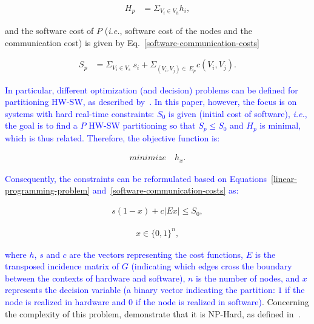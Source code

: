 \documentclass{doublecol-new}
\theoremstyle{TH}{
\newtheorem{lemma}{Lemma}
\newtheorem{theorem}[lemma]{Theorem}
\newtheorem{corrolary}[lemma]{Corrolary}
\newtheorem{conjecture}[lemma]{Conjecture}
\newtheorem{proposition}[lemma]{Proposition}
\newtheorem{claim}[lemma]{Claim}
\newtheorem{stheorem}[lemma]{Wrong Theorem}
\newtheorem{algorithm}{Algorithm}
}
\theoremstyle{THrm}{
\newtheorem{definition}{Definition}[section]
\newtheorem{question}{Question}[section]
\newtheorem{remark}{Remark}
\newtheorem{scheme}{Scheme}
}
\theoremstyle{THhit}{
\newtheorem{case}{Case}[section]
}
\begin{document}
\vspace{-5 mm}
\begin{align}
\label{hardware-costs}
H_p  &= \Sigma_{V_i \in V_h} h_i,
\end{align}

\vspace{2 mm}
\noindent
and the software cost of $P$ ({\it i.e.}, software cost of the nodes and the communication cost) is given by Eq.~\eqref{software-communication-costs}

\vspace{-3 mm}
\begin{align}
\label{software-communication-costs}
  S_p &= \Sigma_{V_i \in V_s}\:s_i + \Sigma_{(V_i,V_j)\in\:E_p} c(V_i,V_j).
\end{align}

\vspace{2 mm}
\textcolor{blue}{In particular, different optimization (and decision) problems can be defined for partitioning HW-SW, as described by~\cite{Arato2003}. In this paper, however, the focus is on systems with hard real-time constraints: $ S_0 $ is given (initial cost of software), {\it i.e.}, the goal is to find a $P$ HW-SW partitioning so that $ S_p \leq S_0 $ and $ H_p $ is minimal, which is thus related. Therefore, the objective function is:} 

\vspace{-2 mm}
\begin{align}
\label{objective-function}
minimize\quad h_x.
\end{align}

\textcolor{blue}{Consequently, the constraints can be reformulated based on Equations~\eqref{linear-programming-problem} and~\eqref{software-communication-costs} as:}

\vspace{-2 mm}
\begin{align}
\label{hw-sw-partitioning}
s\left(1-x\right) + c|Ex| \leq S_0,
\end{align}

\vspace{-2 mm}
\begin{align}
\label{hw-sw-partitioning2}
x \in \{0,1\}^n, 
\end{align}

\vspace{2 mm}
\noindent \textcolor{blue}{where $h$, $s$ and $c$ are the vectors representing the cost functions, $E$ is the transposed incidence matrix of $G$ (indicating which edges cross the boundary between the contexts of hardware and software), $n$ is the number of nodes, and $x$ represents the decision variable (a binary vector indicating the partition: $1$ if the node is realized in hardware and $0$ if the node is realized in software)}. Concerning the complexity of this problem, \cite{Arato2003} demonstrate that it is NP-Hard, as defined in~\cite{Cormem}.
\end{document}
